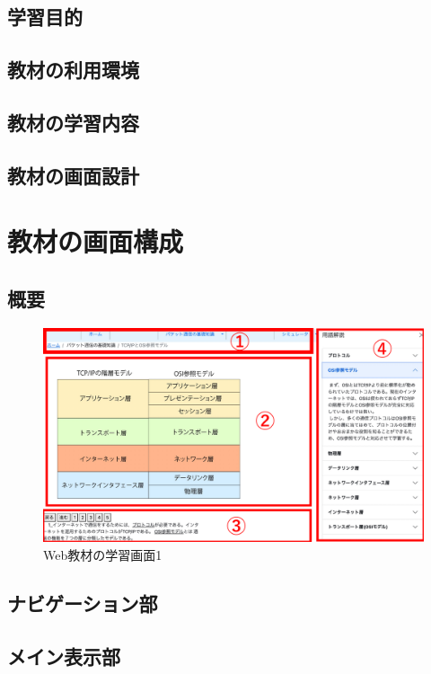 \documentclass[12pt,a4j,titlepage]{ltjsarticle}
\begin{document}
\subsection{学習目的}
\subsection{教材の利用環境}
\subsection{教材の学習内容}
\subsection{教材の画面設計}

\clearpage

\section{教材の画面構成}%
\subsection{概要}

\begin{figure}[h]
\begin{center}
 \includegraphics[clip,width=150mm]{figures/gamen.pdf}
\end{center}
 \caption{Web教材の学習画面1}
 \label{fig:画面}
\end{figure}

\subsection{ナビゲーション部}
\subsection{メイン表示部}
\end{document}

